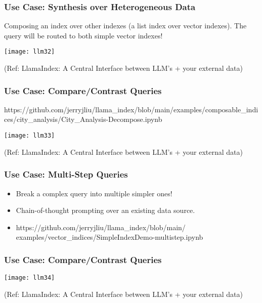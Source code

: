 \begin{frame}[fragile]\frametitle{Use Case: Synthesis over Heterogeneous Data}

Composing an index over other indexes (a list index over vector indexes). 
The query will be routed to both simple vector indexes! 


\begin{center}
\texttt{[image: llm32]}

{\tiny (Ref: LlamaIndex: A Central Interface between LLM’s + your external data)}
\end{center}
\end{frame}

\begin{frame}[fragile]\frametitle{Use Case: Compare/Contrast Queries}

https://github.com/jerryjliu/llama\_index/blob/main/examples/composable\_indices/city\_analysis/City\_Analysis-Decompose.ipynb

\begin{center}
\texttt{[image: llm33]}

{\tiny (Ref: LlamaIndex: A Central Interface between LLM’s + your external data)}
\end{center}
\end{frame}

\begin{frame}[fragile]\frametitle{Use Case: Multi-Step Queries}

\begin{itemize}
\item Break a complex query into multiple simpler ones! 
\item Chain-of-thought prompting over an existing data source.
\item https://github.com/jerryjliu/llama\_index/blob/main/
examples/vector\_indices/SimpleIndexDemo-multistep.ipynb
\end{itemize}	

\end{frame}


\begin{frame}[fragile]\frametitle{Use Case: Compare/Contrast Queries}


\begin{center}
\texttt{[image: llm34]}

{\tiny (Ref: LlamaIndex: A Central Interface between LLM’s + your external data)}
\end{center}
\end{frame}



